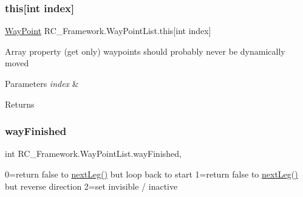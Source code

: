 \subsubsection{\texorpdfstring{this[int index]}{this[int index]}}
{\footnotesize\ttfamily \mbox{\hyperlink{class_r_c___framework_1_1_way_point}{Way\+Point}} R\+C\+\_\+\+Framework.\+Way\+Point\+List.\+this\mbox{[}int index\mbox{]}\hspace{0.3cm}{\ttfamily [get]}}



Array property (get only) waypoints should probably never be dynamically moved 


\begin{DoxyParams}{Parameters}
{\em index} & \\
\hline
\end{DoxyParams}
\begin{DoxyReturn}{Returns}

\end{DoxyReturn}
\mbox{\label{class_r_c___framework_1_1_way_point_list_a458d4b048929d665adaeb7f99e02a246}} 
\subsubsection{\texorpdfstring{way\+Finished}{wayFinished}}
{\footnotesize\ttfamily int R\+C\+\_\+\+Framework.\+Way\+Point\+List.\+way\+Finished\hspace{0.3cm}{\ttfamily [get]}, {\ttfamily [set]}}



0=return false to \mbox{\hyperlink{class_r_c___framework_1_1_way_point_list_aa1d992bceb400ee9fcf657e6a4c379f8}{next\+Leg()}} but loop back to start 1=return false to \mbox{\hyperlink{class_r_c___framework_1_1_way_point_list_aa1d992bceb400ee9fcf657e6a4c379f8}{next\+Leg()}} but reverse direction 2=set invisible / inactive 

\mbox{\label{class_r_c___framework_1_1_way_point_list_ab0df171ffd39426546ab8c8e44f5a464}} 
